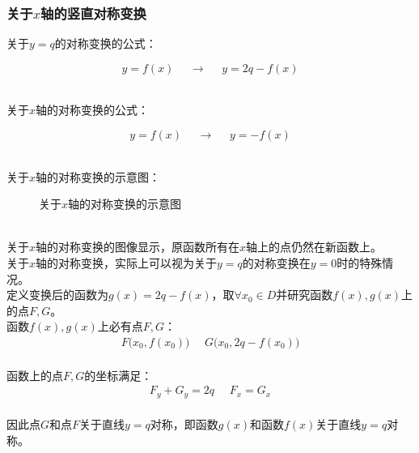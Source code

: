 \documentclass[UTF8]{ctexart}
\begin{document}
\subsubsection{关于$x$轴的竖直对称变换}
    \setcounter{equation}{0}
    关于$y=q$的对称变换的公式：
    \begin{large}
        \begin{equation*}
            y=f(x)~~~~~~\longrightarrow~~~~~~y=2q-f(x)
        \end{equation*}
    \end{large}\\
    关于$x$轴的对称变换的公式：
    \begin{large}
        \begin{equation*}
            y=f(x)~~~~~~\longrightarrow~~~~~~y=-f(x)
        \end{equation*}
    \end{large}\\
    关于$x$轴的对称变换的示意图：
    \begin{figure}[h]
        \begin{center}
            \caption{关于$x$轴的对称变换的示意图}
        \end{center}
    \end{figure}\\
    关于$x$轴的对称变换的图像显示，原函数所有在$x$轴上的点仍然在新函数上。\\[3mm]
    关于$x$轴的对称变换，实际上可以视为关于$y=q$的对称变换在$y=0$时的特殊情况。\\[6mm]
    定义变换后的函数为$g(x)=2q-f(x)$，取$\forall x_0\in D$并研究函数$f(x),g(x)$上的点$F,G$。\\[3mm]
    函数$f(x),g(x)$上必有点$F,G$：
    \begin{align}
        F\big(x_0,f(x_0)\big)~~~~~~G\big(x_0,2q-f(x_0)\big)
    \end{align}\\
    函数上的点$F,G$的坐标满足：
    \begin{align}
        F_y+G_y=2q~~~~~~F_x=G_x
    \end{align}\\
    因此点$G$和点$F$关于直线$y=q$对称，即函数$g(x)$和函数$f(x)$关于直线$y=q$对称。
\end{document}
